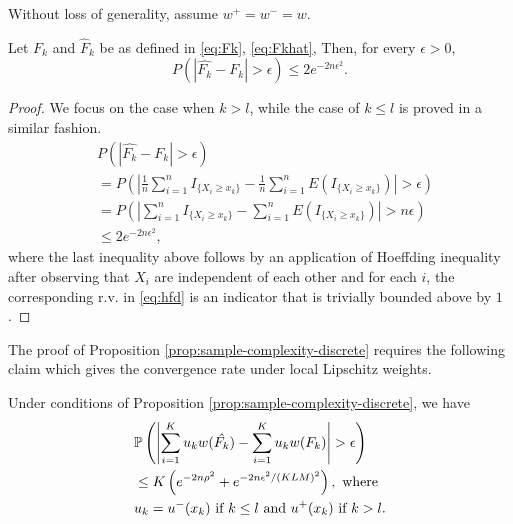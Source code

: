 
Without loss of generality, assume $w^+=w^-=w$.

\begin{proposition}
\label{prop:hoeffding-discrete}
Let $F_k$ and $\hat F_k$ be as defined in \eqref{eq:Fk}, \eqref{eq:Fkhat}, Then, for every $\epsilon >0$, 
$$P(|\hat{F_k}-F_k| > \epsilon) \leq 2 e^{-2n \epsilon^2}.$$
\end{proposition}
\begin{proof}
We focus on the case when $k > l$, while the case of $k \leq l$ is proved in a similar fashion.
\begin{align}
&P(\left|\hat{F_k}- F_k \right| > \epsilon)  \nonumber\\
&= P(\left| \frac{1}{n} \sum_{i=1}^n I_{\{X_i \geq x_k\}} - \frac{1}{n} \sum_{i=1}^n E(I_{\{X_i \geq x_k\}}) \right| > \epsilon) \nonumber\\ 
& = P(\left|\sum_{i=1}^n I_{\{X_i \geq x_k\}} - \sum_{i=1}^n E(I_{\{X_i \geq x_k\}}) \right| > n\epsilon) \label{eq:hfd} \\ 
& \leq 2e^{-2n \epsilon^2},
\end{align}
where the last inequality above follows by an application of Hoeffding inequality after observing that $X_i$ are independent of each other and for each $i$, the corresponding r.v. in \eqref{eq:hfd} is an indicator that is trivially bounded above by $1$.
\end{proof}
The proof of Proposition \ref{prop:sample-complexity-discrete} requires the following claim which gives the convergence rate under local Lipschitz weights. 
\begin{proposition}
\label{prop:discrete-first-term}
Under conditions of Proposition \ref{prop:sample-complexity-discrete}, we have
\begin{align}
&\mathbb{P}\left( \left| \sum_{i=1}^K u_{k} w(\hat{F_k}) - \sum_{i=1}^K u_{k} w(F_k) \right| >\epsilon \right)\nonumber\\
& \le K\left(
e^{-2n\rho^2} + e^{-2n\epsilon^2 /(KLM)^2}\right), \text{ where }\nonumber\\
&u_k = 
   u^{-}(x_{k})  \text{ if   } k \leq l \text{ and } 
   u^{+}(x_{k})  \text{ if  }  k > l.
 \label{eq:uplusminusxk}
\end{align} 
\end{proposition}

